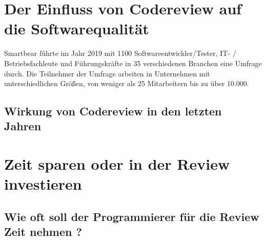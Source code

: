 \section{Der Einfluss von Codereview auf die Softwarequalität}
\label{sec:rEinfluss}
\label{subsec:Ziel}
Smartbear \cite{smartbear} führte im Jahr 2019 mit 1100 Softwareentwickler/Tester, IT- / Betriebsfachleute und Führungskräfte in 35 verschiedenen Branchen eine Umfrage durch. Die Teilnehmer der Umfrage arbeiten in Unternehmen mit unterschiedlichen Größen, von weniger als 25 Mitarbeitern bis zu über 10.000.

\subsection{Wirkung von Codereview in den letzten Jahren}
\label{subsec:rWirkung}

\section{Zeit sparen oder in der Review investieren}
\label{sec:rZeitIstWert}

\subsection{Wie oft soll der Programmierer für die Review Zeit nehmen ?}
\label{subsec:reviewerZeit}
